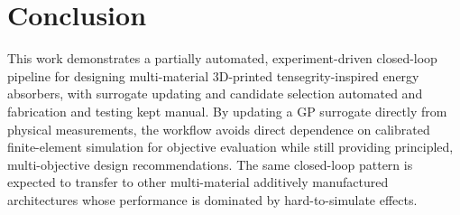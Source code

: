 \documentclass[10pt]{article}
\begin{document}
\section{Conclusion}
This work demonstrates a partially automated, experiment-driven
closed-loop pipeline for designing multi-material 3D-printed
tensegrity-inspired energy absorbers, with surrogate updating and
candidate selection automated and fabrication and testing kept manual.
By updating a GP surrogate directly from physical measurements, the
workflow avoids direct dependence on calibrated finite-element
simulation for objective evaluation while still providing principled,
multi-objective design recommendations. The same closed-loop pattern is
expected to transfer to other multi-material additively manufactured
architectures whose performance is dominated by hard-to-simulate
effects.

{\tiny
\renewcommand{\bibsection}{\section*{\normalsize References}\vspace{-0.5em}}
\setlength{\bibsep}{-0.05em plus 0.1ex}
\providecommand{\doi}[1]{}
\renewcommand{\doi}[1]{\href{https://doi.org/#1}{doi:\,#1}}

}
\end{document}
